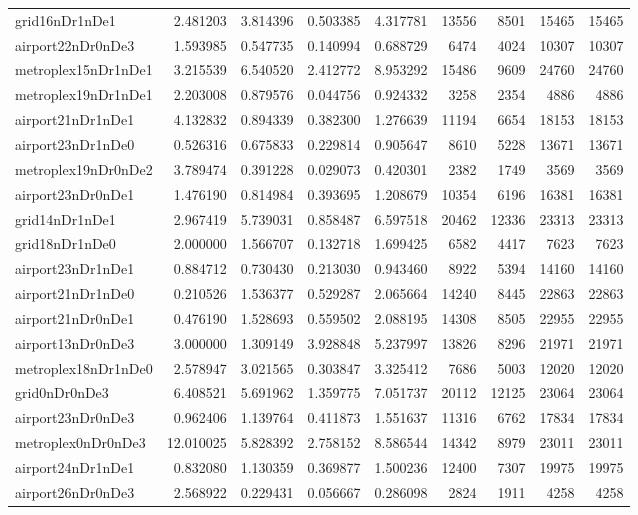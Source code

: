 \begin{longtable}{|l|r|r|r|r|r|r|r|r|}
grid16nDr1nDe1 & 2.481203 & 3.814396 & 0.503385 & 4.317781 & 13556 & 8501 & 15465 & 15465 \\
airport22nDr0nDe3 & 1.593985 & 0.547735 & 0.140994 & 0.688729 & 6474 & 4024 & 10307 & 10307 \\
metroplex15nDr1nDe1 & 3.215539 & 6.540520 & 2.412772 & 8.953292 & 15486 & 9609 & 24760 & 24760 \\
metroplex19nDr1nDe1 & 2.203008 & 0.879576 & 0.044756 & 0.924332 & 3258 & 2354 & 4886 & 4886 \\
airport21nDr1nDe1 & 4.132832 & 0.894339 & 0.382300 & 1.276639 & 11194 & 6654 & 18153 & 18153 \\
airport23nDr1nDe0 & 0.526316 & 0.675833 & 0.229814 & 0.905647 & 8610 & 5228 & 13671 & 13671 \\
metroplex19nDr0nDe2 & 3.789474 & 0.391228 & 0.029073 & 0.420301 & 2382 & 1749 & 3569 & 3569 \\
airport23nDr0nDe1 & 1.476190 & 0.814984 & 0.393695 & 1.208679 & 10354 & 6196 & 16381 & 16381 \\
grid14nDr1nDe1 & 2.967419 & 5.739031 & 0.858487 & 6.597518 & 20462 & 12336 & 23313 & 23313 \\
grid18nDr1nDe0 & 2.000000 & 1.566707 & 0.132718 & 1.699425 & 6582 & 4417 & 7623 & 7623 \\
airport23nDr1nDe1 & 0.884712 & 0.730430 & 0.213030 & 0.943460 & 8922 & 5394 & 14160 & 14160 \\
airport21nDr1nDe0 & 0.210526 & 1.536377 & 0.529287 & 2.065664 & 14240 & 8445 & 22863 & 22863 \\
airport21nDr0nDe1 & 0.476190 & 1.528693 & 0.559502 & 2.088195 & 14308 & 8505 & 22955 & 22955 \\
airport13nDr0nDe3 & 3.000000 & 1.309149 & 3.928848 & 5.237997 & 13826 & 8296 & 21971 & 21971 \\
metroplex18nDr1nDe0 & 2.578947 & 3.021565 & 0.303847 & 3.325412 & 7686 & 5003 & 12020 & 12020 \\
grid0nDr0nDe3 & 6.408521 & 5.691962 & 1.359775 & 7.051737 & 20112 & 12125 & 23064 & 23064 \\
airport23nDr0nDe3 & 0.962406 & 1.139764 & 0.411873 & 1.551637 & 11316 & 6762 & 17834 & 17834 \\
metroplex0nDr0nDe3 & 12.010025 & 5.828392 & 2.758152 & 8.586544 & 14342 & 8979 & 23011 & 23011 \\
airport24nDr1nDe1 & 0.832080 & 1.130359 & 0.369877 & 1.500236 & 12400 & 7307 & 19975 & 19975 \\
airport26nDr0nDe3 & 2.568922 & 0.229431 & 0.056667 & 0.286098 & 2824 & 1911 & 4258 & 4258 \\

\end{longtable}
